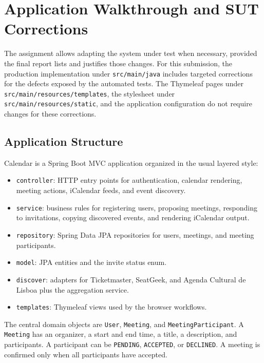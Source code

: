 \chapter{Application Walkthrough and SUT Corrections} \label{cap:sut}

The assignment allows adapting the system under test when necessary, provided the final report lists and justifies those changes. For this submission, the production implementation under \texttt{src/main/java} includes targeted corrections for the defects exposed by the automated tests. The Thymeleaf pages under \texttt{src/main/resources/templates}, the stylesheet under \texttt{src/main/resources/static}, and the application configuration do not require changes for these corrections.

\section{Application Structure}

Calendar is a Spring Boot MVC application organized in the usual layered style:

\begin{itemize}
\item \texttt{controller}: HTTP entry points for authentication, calendar rendering, meeting actions, iCalendar feeds, and event discovery.
\item \texttt{service}: business rules for registering users, proposing meetings, responding to invitations, copying discovered events, and rendering iCalendar output.
\item \texttt{repository}: Spring Data JPA repositories for users, meetings, and meeting participants.
\item \texttt{model}: JPA entities and the invite status enum.
\item \texttt{discover}: adapters for Ticketmaster, SeatGeek, and Agenda Cultural de Lisboa plus the aggregation service.
\item \texttt{templates}: Thymeleaf views used by the browser workflows.
\end{itemize}

The central domain objects are \texttt{User}, \texttt{Meeting}, and \texttt{MeetingParticipant}. A \texttt{Meeting} has an organizer, a start and end time, a title, a description, and participants. A participant can be \texttt{PENDING}, \texttt{ACCEPTED}, or \texttt{DECLINED}. A meeting is confirmed only when all participants have accepted.

